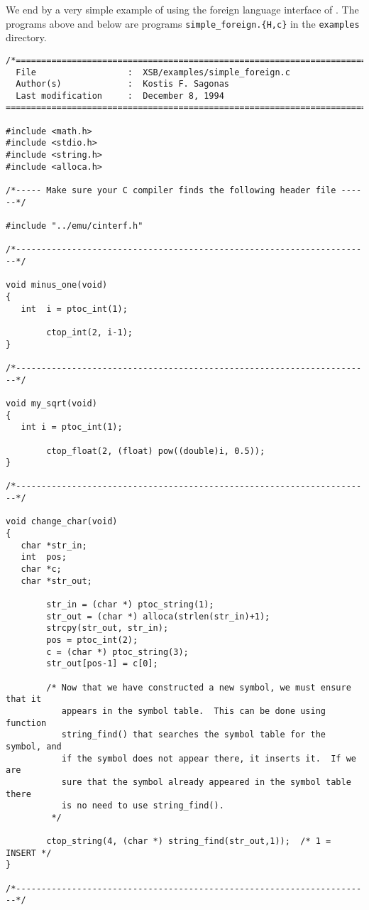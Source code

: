 We end by a very simple example of using the foreign language
interface of \ourprolog.  The programs above and below are programs
{\tt simple\_foreign.\{H,c\}} in the {\tt examples} directory.

\begin{small}
\begin{verbatim}
/*======================================================================
  File                  :  XSB/examples/simple_foreign.c
  Author(s)             :  Kostis F. Sagonas
  Last modification     :  December 8, 1994
========================================================================*/

#include <math.h>
#include <stdio.h>
#include <string.h>
#include <alloca.h>

/*----- Make sure your C compiler finds the following header file ------*/

#include "../emu/cinterf.h"

/*----------------------------------------------------------------------*/

void minus_one(void)
{
   int  i = ptoc_int(1);

        ctop_int(2, i-1);
}

/*----------------------------------------------------------------------*/

void my_sqrt(void)
{
   int i = ptoc_int(1);

        ctop_float(2, (float) pow((double)i, 0.5));
}

/*----------------------------------------------------------------------*/

void change_char(void)
{
   char *str_in;
   int  pos;
   char *c;
   char *str_out;

        str_in = (char *) ptoc_string(1);
        str_out = (char *) alloca(strlen(str_in)+1);
        strcpy(str_out, str_in);
        pos = ptoc_int(2);
        c = (char *) ptoc_string(3);
        str_out[pos-1] = c[0];

        /* Now that we have constructed a new symbol, we must ensure that it
           appears in the symbol table.  This can be done using function
           string_find() that searches the symbol table for the symbol, and
           if the symbol does not appear there, it inserts it.  If we are
           sure that the symbol already appeared in the symbol table there
           is no need to use string_find().
         */

        ctop_string(4, (char *) string_find(str_out,1));  /* 1 = INSERT */
}

/*----------------------------------------------------------------------*/
\end{verbatim}
\end{small}

